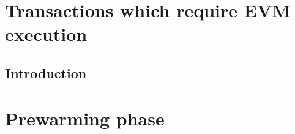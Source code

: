 \section{Transactions which require EVM execution}
\subsection{Introduction}                                \label{hub: tx w/ evm execution introduction}       
\section{Prewarming phase }                   \label{hub: prewarming}                              %
